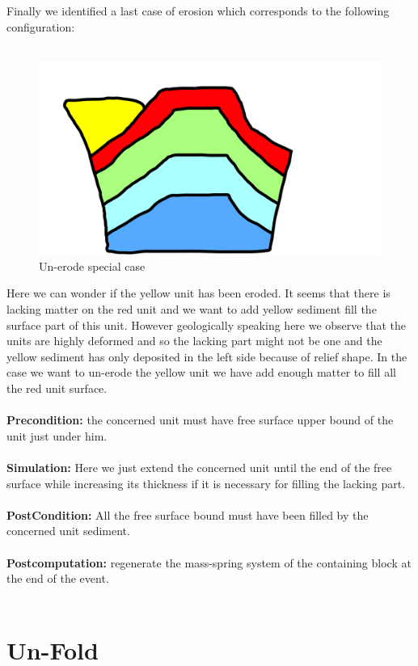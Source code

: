 \documentclass[12pt, a4paper]{memoir} %
\begin{document}
Finally we identified a last case of erosion which corresponds to the following configuration:\\\\
\begin{figure}[H]
	\centering
	\includegraphics[scale=0.3]{unErodeSpecial.png}
	\caption{Un-erode special case}
\end{figure}
Here we can wonder if the yellow unit has been eroded.  It seems that there is lacking matter on the red unit and we want to add yellow sediment fill the surface part of this unit. However geologically speaking here we observe that the units are highly deformed and so the lacking part might not be one and the yellow sediment has only deposited in the left side because of relief shape. In the case we want to un-erode  the yellow unit we have add enough matter to fill all the red unit surface.\\\\
\textbf{Precondition:} the concerned unit must have free surface upper bound of the unit just under him.\\\\
\textbf{Simulation:} Here we just extend the concerned unit until the end of the free surface while increasing its thickness if it is necessary for filling the lacking part.\\\\
\textbf{PostCondition:} All the free surface bound must have been filled by the concerned unit sediment.\\\\
\textbf{Postcomputation:} regenerate the mass-spring system of the containing block at the end of the event.\\\\

\section{Un-Fold}
\end{document}
